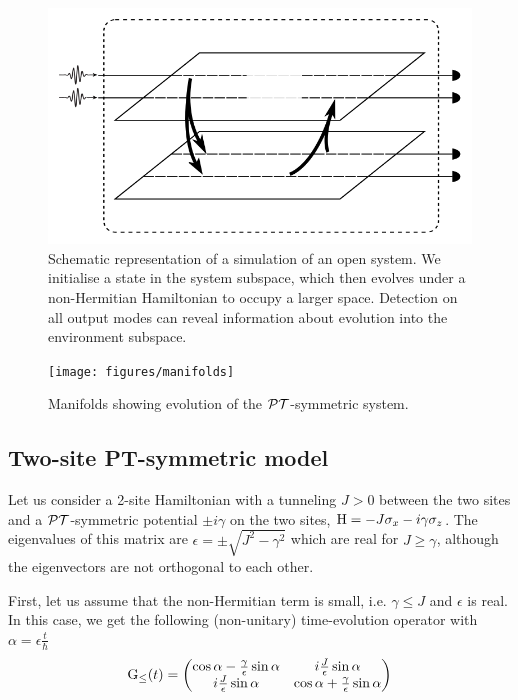 \begin{figure}[t]
  \centering
  \includegraphics{figures/opensystem}
  \caption[Representation of an open system]
  {Schematic representation of a simulation of an open system. We initialise a
  state in the system subspace, which then evolves under a non-Hermitian
  Hamiltonian to occupy a larger space. Detection on all output modes can reveal
  information about evolution into the environment subspace.}
  \label{fig:opensystem}
\end{figure}

\begin{figure}[t]
  \centering
  \texttt{[image: figures/manifolds]}
  \caption[Manifolds showing evolution of the PT-symmetric system]
  {Manifolds showing evolution of the \(\mathcal{PT}{}\)-symmetric system.}
  \label{fig:manifolds}
\end{figure}

\subsection{Two-site PT-symmetric model}
Let us consider a 2-site Hamiltonian with a tunneling \(J > 0\) between the two
sites and a \(\mathcal{PT}{}\)-symmetric potential \(\pm i \gamma\) on the two sites, \(
\mathrm{H} = -J \sigma_x -i \gamma \sigma_z\). The eigenvalues of this matrix are
\( \epsilon = \pm \sqrt{J^{2} - \gamma^{2}} \) which are real for \( J \geq
\gamma \), although the eigenvectors are not orthogonal to each other.

First, let us assume that the non-Hermitian term is small, i.e. \( \gamma \leq
J \) and \( \epsilon \) is real. In this case, we get the following
(non-unitary) time-evolution operator with \( \alpha = \epsilon \frac{t}{\hbar}
\)
\begin{equation}
  \mathrm{G}_{\leq} \!\left(t\right) = \begin{pmatrix}
    \cos \alpha - \frac{\gamma}{\epsilon} \sin \alpha &
    i \frac{J}{\epsilon} \sin \alpha \\
    i \frac{J}{\epsilon} \sin \alpha &
    \cos \alpha + \frac{\gamma}{\epsilon} \sin \alpha
  \end{pmatrix}
\end{equation}

